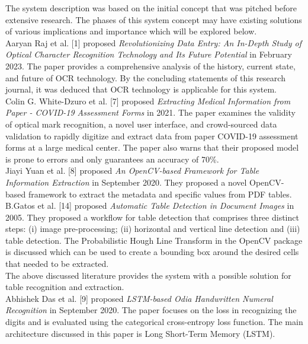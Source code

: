 \noindent
The system description was based on the initial concept that was pitched before extensive research. The phases of this system concept may have existing solutions of various implications and importance which will be explored below.\\

\noindent
Aaryan Raj et al. [1] proposed {\it Revolutionizing Data Entry: An In-Depth Study of Optical Character Recognition Technology and Its Future Potential} in February 2023.
\noindent
The paper provides a comprehensive analysis of the history, current state, and future of OCR technology. By the concluding statements of this research journal, it was deduced that OCR technology is applicable for this system.\\

\noindent
Colin G. White-Dzuro et al. [7] proposed {\it Extracting Medical Information from Paper - COVID-19 Assessment Forms} in 2021. 
\noindent
The paper examines the validity of optical mark recognition, a novel user interface, and crowd-sourced data validation to rapidly digitize and extract data from paper COVID-19 assessment forms at a large medical center. The paper also warns that their proposed model is prone to errors and only guarantees an accuracy of 70\%.\\

\noindent
Jiayi Yuan et al. [8] proposed {\it An OpenCV-based Framework for Table Information Extraction} in September 2020. 
\noindent
They proposed a novel OpenCV-based framework to extract the metadata and specific values from PDF tables. \\

\noindent
B.Gatos et al. [14] proposed {\it Automatic Table Detection in Document Images} in 2005. 
\noindent
They proposed a workflow for table detection that comprises three distinct steps: (i) image pre-processing; (ii) horizontal and vertical line detection and (iii) table detection. The Probabilistic Hough Line Transform in the OpenCV package is discussed which can be used to create a bounding box around the desired cells that needed to be extracted. \\

\noindent The above discussed literature provides the system with a possible solution for table recognition and extraction. \\

\noindent
Abhishek Das et al. [9] proposed {\it LSTM-based  Odia  Handwritten  Numeral Recognition} in September 2020.
\noindent
The paper focuses on the loss in recognizing the digits and is evaluated using the categorical cross-entropy loss function. The main architecture discussed in this paper is Long Short-Term Memory (LSTM).\\

